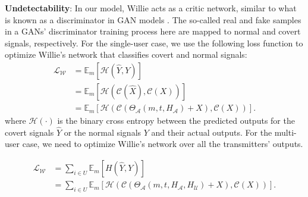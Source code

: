\textbf{Undetectability}: In our model, Willie acts as a critic network, similar to what is known as a discriminator in GAN models \cite{goodfellow2014generative}. The so-called real and fake samples in a GANs' discriminator training process here are mapped to normal and covert signals, respectively. For the single-user case, we use the following loss function to optimize Willie's network that classifies covert and normal signals:
\begin{equation}
	\begin{aligned} \label{willie_loss}
		\mathcal{L}_{\mathcal{W}} & = \mathbb{E}_{m}[\mathcal{H}(\hat{Y}, Y)] \\
		& = \mathbb{E}_{m}[\mathcal{H}(\mathcal{C}(\hat{X}), \mathcal{C}(X))] \\
		& = \mathbb{E}_{m}[\mathcal{H}(\mathcal{C}(\Theta_{\mathcal{A}}(m, t, H_{\mathcal{A}}) + X), \mathcal{C}(X))].
	\end{aligned}
\end{equation}
where \(\mathcal{H}(\cdot)\) is the binary cross entropy between the predicted outputs for the covert signals \(\hat{Y}\) or the normal signals \(Y\) and their actual outputs. For the multi-user case, we need to optimize Willie's network over all the transmitters' outputs.

\begin{equation}
	\begin{aligned} \label{multi_willie_loss}
		\mathcal{L}_{\mathcal{W}} & = 
		\sum_{i \in U} \mathbb{E}_{m}[H(\hat{Y}, Y)] \\
		& = \sum_{i \in U}
		\mathbb{E}_{m}[\mathcal{H}(\mathcal{C}(\Theta_{\mathcal{A}}(m, t, H_{\mathcal{A}}, H_{\mathcal{U}}) + X), \mathcal{C}(X))].
	\end{aligned}
\end{equation}

